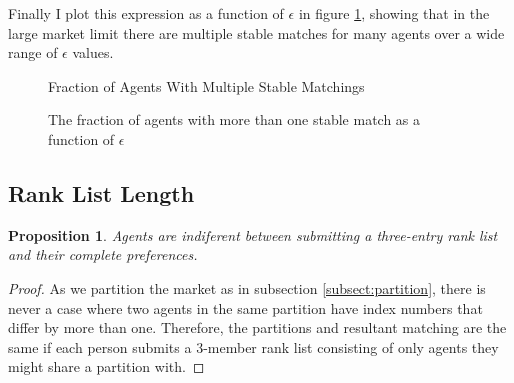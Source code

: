 \documentclass[WP]{AEA}
\newtheorem{prop}{Proposition}
\begin{document}
Finally I plot this expression as a function of $\epsilon$ in figure \ref{fig:multi_match}, showing that in the large market limit there are multiple stable matches for many agents over a wide range of $\epsilon$ values.

\begin{figure}[p]{Fraction of Agents With Multiple Stable Matchings}
	\caption{The fraction of agents with more than one stable match as a function of $\epsilon$}
	\label{fig:multi_match}
\end{figure}

\subsection{Rank List Length}

\begin{prop}
	Agents are indiferent between submitting a three-entry rank list and their complete preferences.
\end{prop}

\begin{proof}
	As we partition the market as in subsection \ref{subsect:partition}, there is never a case where two agents in the same partition have index numbers that differ by more than one. Therefore, the partitions and resultant matching are the same if each person submits a 3-member rank list consisting of only agents they might share a partition with.
\end{proof}
\end{document}
